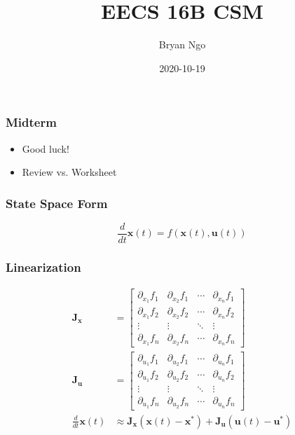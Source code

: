 \documentclass[aspectratio=169]{beamer}
\title{EECS 16B CSM}
\author{Bryan Ngo}
\date{2020-10-19}
\institute{UC Berkeley}
\newcommand{\diff}[1]{\frac{d}{d #1}}
\begin{document}
\begin{frame}
    \maketitle
\end{frame}

\begin{frame}
    \frametitle{Midterm}

    \begin{itemize}
        \item Good luck!
        \item Review vs. Worksheet
    \end{itemize}
\end{frame}

\begin{frame}
    \frametitle{State Space Form}

    \begin{equation}
        \diff{t} \bm{x}(t) = f(\bm{x}(t), \bm{u}(t))
    \end{equation}
\end{frame}

\begin{frame}
    \frametitle{Linearization}

    \begin{align}
        \bm{J}_{\bm{x}} &=
        \begin{bmatrix}
            \partial_{x_1} f_1 & \partial_{x_2} f_1 & \cdots & \partial_{x_n} f_1 \\
            \partial_{x_1} f_2 & \partial_{x_2} f_2 & \cdots & \partial_{x_n} f_2 \\
            \vdots & \vdots & \ddots & \vdots \\
            \partial_{x_1} f_n & \partial_{x_2} f_n & \cdots & \partial_{x_n} f_n
        \end{bmatrix} \\
        \bm{J}_{\bm{u}} &=
        \begin{bmatrix}
            \partial_{u_1} f_1 & \partial_{u_2} f_1 & \cdots & \partial_{u_n} f_1 \\
            \partial_{u_1} f_2 & \partial_{u_2} f_2 & \cdots & \partial_{u_n} f_2 \\
            \vdots & \vdots & \ddots & \vdots \\
            \partial_{u_1} f_n & \partial_{u_2} f_n & \cdots & \partial_{u_n} f_n
        \end{bmatrix} \\
        \diff{t} \bm{x}(t) &\approx \bm{J}_{\bm{x}} (\bm{x}(t) - \bm{x}^\ast) + \bm{J}_{\bm{u}} (\bm{u}(t) -\bm{u}^\ast)
    \end{align}
\end{frame}
\end{document}
